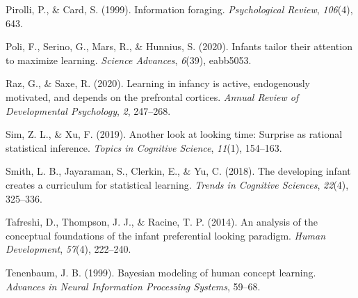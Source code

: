 \documentclass[10pt, letterpaper]{article}
\newenvironment{CSLReferences}%
  {}%
  {\par}
\begin{document}
\begin{CSLReferences}{1}{0}
\leavevmode{}%
Pirolli, P., \& Card, S. (1999). Information foraging.
\emph{Psychological Review}, \emph{106}(4), 643.

\leavevmode{}%
Poli, F., Serino, G., Mars, R., \& Hunnius, S. (2020). Infants tailor
their attention to maximize learning. \emph{Science Advances},
\emph{6}(39), eabb5053.

\leavevmode{}%
Raz, G., \& Saxe, R. (2020). Learning in infancy is active, endogenously
motivated, and depends on the prefrontal cortices. \emph{Annual Review
of Developmental Psychology}, \emph{2}, 247--268.

\leavevmode{}%
Sim, Z. L., \& Xu, F. (2019). Another look at looking time: Surprise as
rational statistical inference. \emph{Topics in Cognitive Science},
\emph{11}(1), 154--163.

\leavevmode{}%
Smith, L. B., Jayaraman, S., Clerkin, E., \& Yu, C. (2018). The
developing infant creates a curriculum for statistical learning.
\emph{Trends in Cognitive Sciences}, \emph{22}(4), 325--336.

\leavevmode{}%
Tafreshi, D., Thompson, J. J., \& Racine, T. P. (2014). An analysis of
the conceptual foundations of the infant preferential looking paradigm.
\emph{Human Development}, \emph{57}(4), 222--240.

\leavevmode{}%
Tenenbaum, J. B. (1999). Bayesian modeling of human concept learning.
\emph{Advances in Neural Information Processing Systems}, 59--68.

\end{CSLReferences}


\end{document}
